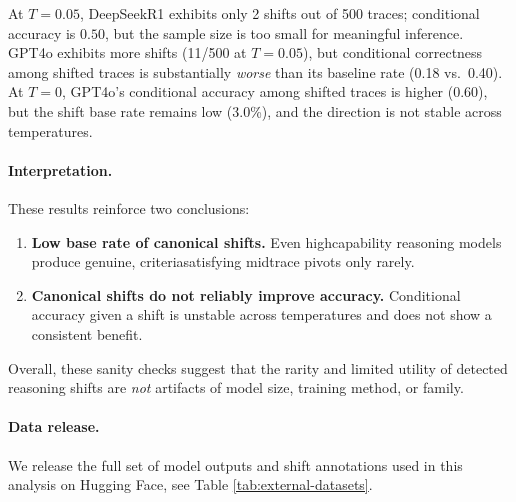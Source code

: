 At $T{=}0.05$, DeepSeek\textendash R1 exhibits only 2 shifts out of 500 traces; conditional accuracy is $0.50$, but the sample size is too small for meaningful inference. GPT\textendash 4o exhibits more shifts (11/500 at $T{=}0.05$), but conditional correctness among shifted traces is substantially \emph{worse} than its baseline rate (0.18 vs.\ 0.40). At $T{=}0$, GPT\textendash 4o's conditional accuracy among shifted traces is higher (0.60), but the shift base rate remains low (3.0\%), and the direction is not stable across temperatures.

\paragraph{Interpretation.}
These results reinforce two conclusions:
\begin{enumerate}[leftmargin=*]
    \item \textbf{Low base rate of canonical shifts.}
    Even high\textendash capability reasoning models produce genuine, criteria\textendash satisfying mid\textendash trace pivots only rarely.
    \item \textbf{Canonical shifts do not reliably improve accuracy.}
    Conditional accuracy given a shift is unstable across temperatures and does not show a consistent benefit.
\end{enumerate}
Overall, these sanity checks suggest that the rarity and limited utility of detected reasoning shifts are \emph{not} artifacts of model size, training method, or family.

\paragraph{Data release.}
We release the full set of model outputs and shift annotations used in this analysis on Hugging Face, see Table \ref{tab:external-datasets}.

